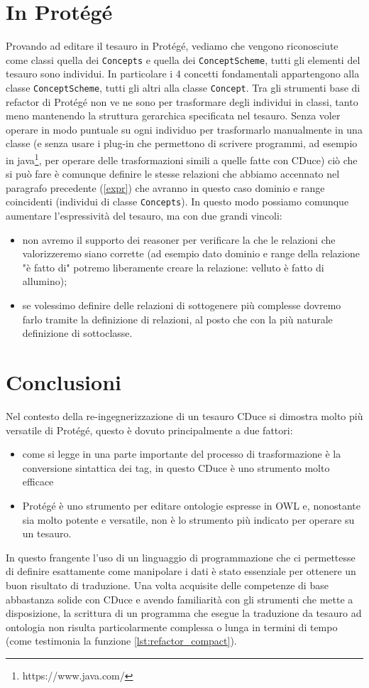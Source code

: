 \section{In Protégé}
Provando ad editare il tesauro in Protégé, vediamo che vengono riconosciute come classi quella dei \verb|Concepts| e quella dei \verb|ConceptScheme|, tutti gli elementi del tesauro sono individui. In particolare i 4 concetti fondamentali appartengono alla classe \verb|ConceptScheme|, tutti gli altri alla classe \verb|Concept|. Tra gli strumenti base di refactor di Protégé non ve ne sono per trasformare degli individui in classi, tanto meno mantenendo la struttura gerarchica specificata nel tesauro. Senza voler operare in modo puntuale su ogni individuo per trasformarlo manualmente in una classe (e senza usare i plug-in che permettono di scrivere programmi, ad esempio in java\footnote{https://www.java.com/}, per operare delle trasformazioni simili a quelle fatte con CDuce) ciò che si può fare è comunque definire le stesse relazioni che abbiamo accennato nel paragrafo precedente (\ref{expr}) che avranno in questo caso dominio e range coincidenti (individui di classe \verb|Concepts|). In questo modo possiamo comunque aumentare l'espressività del tesauro, ma con due grandi vincoli:
\begin{itemize}
	\item non avremo il supporto dei reasoner per verificare la che le relazioni che valorizzeremo siano corrette (ad esempio dato dominio e range della relazione "è fatto di" potremo liberamente creare la relazione: velluto è fatto di allumino);
	\item se volessimo definire delle relazioni di sottogenere più complesse dovremo farlo tramite la definizione di relazioni, al posto che con la più naturale definizione di sottoclasse.
\end{itemize}
\section{Conclusioni}
Nel contesto della re-ingegnerizzazione di un tesauro CDuce si dimostra molto più versatile di Protégé, questo è dovuto principalmente a due fattori:
\begin{itemize}
	\item come si legge in \cite{re_engineeringThesaurus} una parte importante del processo di trasformazione è la conversione sintattica dei tag, in questo CDuce è uno strumento molto efficace
	\item Protégé è uno strumento per editare ontologie espresse in OWL \cite{protege_doc} e, nonostante sia molto potente e versatile, non è lo strumento più indicato per operare su un tesauro.
\end{itemize}
In questo frangente l'uso di un linguaggio di programmazione che ci permettesse di definire esattamente come manipolare i dati è stato essenziale per ottenere un buon risultato di traduzione. Una volta acquisite delle competenze di base abbastanza solide con CDuce e avendo familiarità con gli strumenti che mette a disposizione, la scrittura di un programma che esegue la traduzione da tesauro ad ontologia non risulta particolarmente complessa o lunga in termini di tempo (come testimonia la funzione \ref{lst:refactor_compact}).

